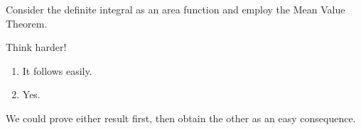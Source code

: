\documentclass[10pt,]{article}
\theoremstyle{plain}
\theoremstyle{definition}
\theoremstyle{definition}
\theoremstyle{definition}
\theoremstyle{definition}
\theoremstyle{definition}
\theoremstyle{definition}
\numberwithin{equation}{section}
\begin{document}
%
\par\smallskip
\hypertarget{p-513}{}%
Consider the definite integral as an area function and employ the Mean Value Theorem.%
\par\smallskip
\hypertarget{p-514}{}%
Think harder!%
\par\smallskip
\hypertarget{p-515}{}%
\leavevmode%
\begin{enumerate}[label=(\alph*)]
\item\hypertarget{li-162}{}\hypertarget{p-516}{}%
It follows easily.%
\item\hypertarget{li-163}{}\hypertarget{p-517}{}%
Yes.%
\end{enumerate}
%
\par\smallskip
\hypertarget{p-518}{}%
We could prove either result first, then obtain the other as an easy consequence.%
\par\smallskip
\typeout{************************************************}
\typeout{************************************************}
\end{document}
